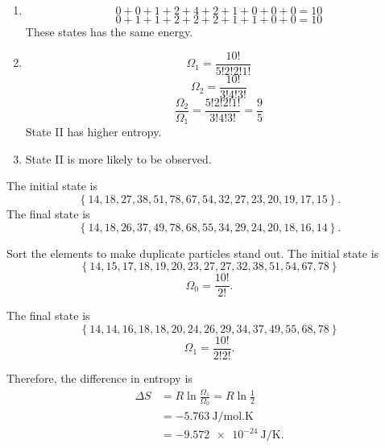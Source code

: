\begin{@empty}
\begin{problem}
\end{problem}

\begin{problem}
\end{problem}

\begin{answer}
    \begin{enumerate}
        \item
            \[ 0 + 0 + 1 + 2 + 4 + 2 + 1 + 0 + 0 + 0 = 10 \]
            \[ 0 + 1 + 1 + 2 + 2 + 2 + 1 + 1 + 0 + 0 = 10 \]
            These states has the same energy.
        \item
            \[ \Omega_1 = \frac{10!}{5!2!2!1!} \]
            \[ \Omega_2 = \frac{10!}{3!4!3!} \]
            \[ \frac{\Omega_2}{\Omega_1} = \frac{5!2!2!1!}{3!4!3!} = \frac95 \]
            State II has higher entropy.
        \item State II is more likely to be observed.
    \end{enumerate}
\end{answer}

\begin{problem}
\end{problem}

\begin{problem}
\end{problem}

\begin{answer}
    The initial state is
    \[ \left\{ 14, 18, 27, 38, 51, 78, 67, 54, 32, 27, 23, 20, 19, 17, 15 \right\}.\]
    The final state is
    \[ \left\{ 14, 18, 26, 37, 49, 78, 68, 55, 34, 29, 24, 20, 18, 16, 14 \right\}.\]

    Sort the elements to make duplicate particles stand out.  The initial state
    is
    \[ \left\{ 14, 15, 17, 18, 19, 20, 23, 27, 27, 32, 38, 51, 54, 67, 78 \right\} \]
    \[ \Omega_0 = \frac{10!}{2!}.\]

    The final state is
    \[ \left\{ 14, 14, 16, 18, 18, 20, 24, 26, 29, 34, 37, 49, 55, 68, 78 \right\} \]
    \[ \Omega_1 = \frac{10!}{2!2!}.\]

    Therefore, the difference in entropy is
    \begin{align*}
        \Delta S &= R \ln \frac{\Omega_1}{\Omega_0} = R \ln\frac12 \\
        &= \SI{-5.763}{\joule/\mol.\kelvin} \\
        &= \SI{-9.572e-24}{\joule/\kelvin}.
    \end{align*}
\end{answer}
\end{@empty}

